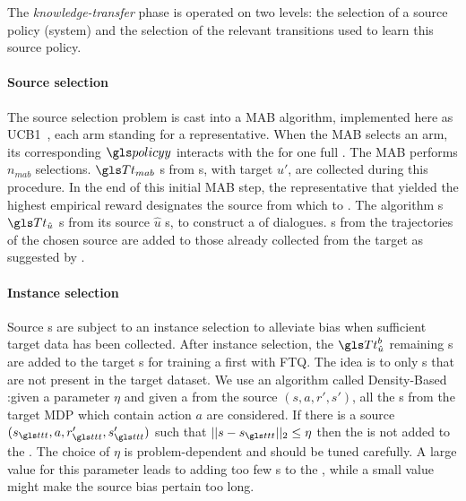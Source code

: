 The \textit{knowledge-transfer} phase is operated on two levels: the selection of a source policy (system) and the selection of the relevant transitions used to learn this source policy.

\paragraph{Source selection} The source selection problem is cast into a \gls{MAB} algorithm, implemented here as \gls{UCB}1~\parencite{auer2002}, each arm standing for a representative. When the \gls{MAB} selects an arm, its corresponding  $\policy$ interacts with the  for one full . The \gls{MAB} performs $n_{mab}$  selections. $\T_{mab}$ s from s, with target  $u'$, are collected during this procedure. In the end of this initial \gls{MAB} step, the representative  that yielded the highest empirical reward designates the source from which to . The algorithm s $\T_{\hat{u}}$ s from its source $\hat{u}$ s, to construct a  of dialogues. s from the trajectories of the chosen source are added to those already collected from the target as suggested by \textcite{Lazaric2008}.

\paragraph{Instance selection} Source s are subject to an instance selection to alleviate bias when sufficient target data has been collected. After instance selection, the $\T^b_{\hat{u}}$ remaining s are added to the target s for training a first  with \acrfull{FTQ}. The idea is to only  s that are not present in the target  dataset. We use an algorithm called Density-Based~\parencite{Genevay2016} :given a parameter $\eta$ and given a  from the source $(s,a,r',s')$, all the s from the target \gls{MDP} which contain action $a$ are considered. If there is a source   $(s_{\indextransition},a,r_{\indextransition}',s_{\indextransition}')$ such that $||s - s_{\indextransition}||_2 \leq \eta$ then the  is not added to the . The choice of $\eta$ is problem-dependent and should be tuned carefully. A large value for this parameter leads to adding too few s to the , while a small value might make the source bias pertain too long.

